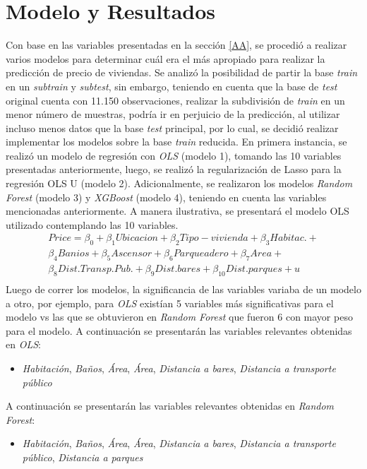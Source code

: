 \documentclass[conference, 10pt]{IEEEtran}
\begin{document}
\section{Modelo y Resultados}
Con base en las variables presentadas en la sección \ref{AA}, se procedió a realizar varios modelos para determinar cuál era el más apropiado para realizar la predicción de precio de viviendas. Se analizó la posibilidad de partir la base \textit{train} en un \textit{subtrain} y \textit{subtest}, sin embargo, teniendo en cuenta que la base de \textit{test} original cuenta con 11.150 observaciones, realizar la subdivisión de \textit{train} en un menor número de muestras, podría ir en perjuicio de la predicción, al utilizar incluso menos datos que la base \textit{test} principal, por lo cual, se decidió realizar implementar los modelos sobre la base \textit{train} reducida. En primera instancia, se realizó un modelo de regresión con \textit{OLS} (modelo 1), tomando las 10 variables presentadas anteriormente, luego, se realizó la regularización de Lasso para la regresión OLS U (modelo 2). Adicionalmente, se realizaron los modelos \textit{Random Forest} (modelo 3) y \textit{XGBoost} (modelo 4), teniendo en cuenta las variables mencionadas anteriormente. A manera ilustrativa, se presentará el modelo OLS utilizado contemplando las 10 variables.
\begin{multline*}
Price= \beta_{0}+\beta_{1}Ubicacion+\beta_{2}Tipo-vivienda+\beta_{3}Habitac.+\\
\beta_{4}Banios+\beta_{5}Ascensor+\beta_{6}Parqueadero+\beta_{7}Area+\\
\beta_{8}Dist.Transp.Pub.+\beta_{9}Dist.bares+\beta_{10}Dist.parques+u \\
\end{multline*}
Luego de correr los modelos, la significancia de las variables variaba de un modelo a otro, por ejemplo, para \textit{OLS} existían 5 variables más significativas para el modelo vs las que se obtuvieron en \textit{Random Forest} que fueron 6 con mayor peso para el modelo. A continuación se presentarán las variables relevantes obtenidas en \textit{OLS}:
\begin{itemize}
\item \textit{Habitación}, \textit{Baños}, \textit{Área}, \textit{Área}, \textit{Distancia a bares}, \textit{Distancia a transporte público} 
\end{itemize}
A continuación se presentarán las variables relevantes obtenidas en \textit{Random Forest}:
\begin{itemize}
\item \textit{Habitación}, \textit{Baños}, \textit{Área}, \textit{Área}, \textit{Distancia a bares}, \textit{Distancia a transporte público},  \textit{Distancia a parques}
\end{itemize}
\end{document}
